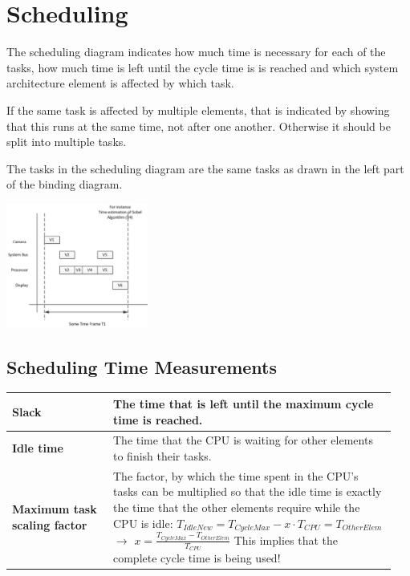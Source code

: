 \section{Scheduling }
	\begin{multicols}{2}		
		\begin{compactitem}
		  \item The scheduling diagram indicates how much time is necessary for each of the tasks, how much time is left until the cycle time is is reached and which system architecture element is affected by which task.
		  \item If the same task is affected by multiple elements, that is indicated by showing that this runs at the same time, not after one another. Otherwise it should be split into multiple tasks.
		  \item The tasks in the scheduling diagram are the same tasks as drawn in the left part of the binding diagram.
		\end{compactitem}
	
		\includegraphics[width=0.35\textwidth]{./pictures/scheduling.png}
	\end{multicols}	
	
	\subsection{Scheduling Time Measurements}
	\begin{table}[H]\centering
		\begin{tabular}{|>{\bfseries}p{0.25\linewidth}|p{0.7\linewidth}|}
			\hline
				Slack
					& The time that is left until the maximum cycle time is reached.\\
			\hline
				Idle time
					& The time that the CPU is waiting for other elements to finish their tasks.\\
			\hline
				Maximum task scaling factor
					& The factor, by which the time spent in the CPU's tasks can be multiplied so that the idle time is exactly the time that the other elements require while the CPU is idle: \newline 
					{$T_{IdleNew} = T_{CycleMax} - x \cdot T_{CPU} = T_{OtherElem}$} $\rightarrow$
					{$x = \frac{T_{CycleMax} - T_{OtherElem}}{T_{CPU}}$} \newline
					This implies that the complete cycle time is being used!\\
			\hline
		\end{tabular}
	\end{table}
	
